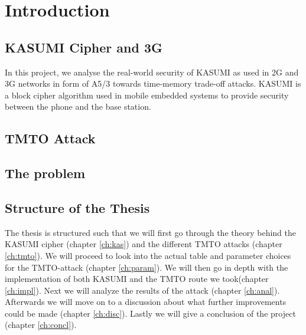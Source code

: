 \chapter{Introduction}

\section{KASUMI Cipher and 3G}

In this project, we analyse the real-world security of KASUMI as used
in 2G and 3G networks in form of A5/3 towards time-memory trade-off
attacks. KASUMI is a block cipher algorithm used in mobile embedded
systems to provide security between the phone and the base station. 

\section{TMTO Attack}



\section{The problem}



\section{Structure of the Thesis}

The thesis is structured such that we will first go through the theory
behind the KASUMI cipher (chapter \ref{ch:kas}) and the different TMTO
attacks (chapter \ref{ch:tmto}). We will proceed to look into the
actual table and parameter choices for the TMTO-attack (chapter
\ref{ch:param}). We will then go in depth with the
implementation of both KASUMI and the TMTO route we took(chapter
\ref{ch:impl}). Next we will analyze the results of the attack
(chapter \ref{ch:anal}). Afterwards we will move on to a discussion
about what further improvements could be made (chapter
\ref{ch:disc}). Lastly we will give a conclusion of the project
(chapter \ref{ch:concl}).

